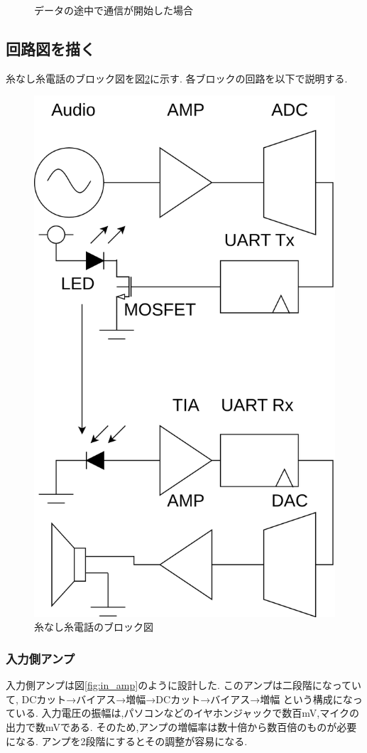 \documentclass[a4paper,10pt]{article}
\begin{document}
\begin{multicols}{2}[\raggedcolumns]
\begin{figure}[H]
    \caption{データの途中で通信が開始した場合} 
    \label{fig:saikai_protocol}
\end{figure}

\subsection{回路図を描く}
糸なし糸電話のブロック図を図\ref{fig:block_diagram}に示す.
各ブロックの回路を以下で説明する.

\begin{figure}[H]
    \centering
    \includegraphics[width=0.8\linewidth]{figure/block_diagram.png} 
    \caption{糸なし糸電話のブロック図} 
    \label{fig:block_diagram}
\end{figure}

\subsubsection{入力側アンプ}
入力側アンプは図\ref{fig:in_amp}のように設計した.
このアンプは二段階になっていて,
  DCカット→バイアス→増幅→DCカット→バイアス→増幅
という構成になっている.
入力電圧の振幅は,パソコンなどのイヤホンジャックで数百mV,マイクの出力で数mVである.
そのため,アンプの増幅率は数十倍から数百倍のものが必要になる.
アンプを2段階にするとその調整が容易になる.


\end{multicols}
\end{document}
